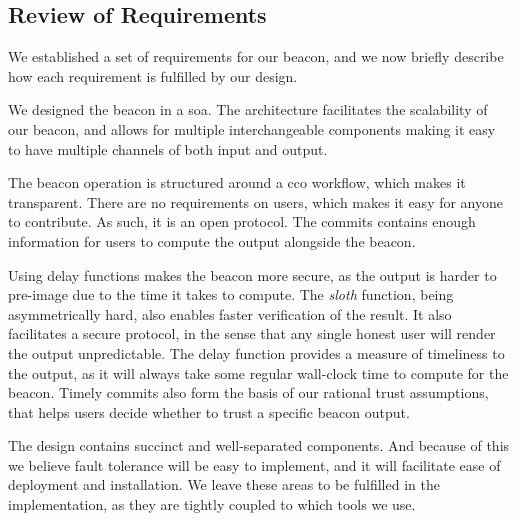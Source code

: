 \subsection{Review of Requirements}
We established a set of requirements for our beacon, and we now briefly describe how each requirement is fulfilled by our design.







We designed the beacon in a \gls{soa}.
The architecture facilitates the scalability of our beacon, and allows for multiple interchangeable components making it easy to have multiple channels of both input and output.

The beacon operation is structured around a \acrshort{cco} workflow, which makes it transparent.
There are no requirements on users, which makes it easy for anyone to contribute.
As such, it is an open protocol.
The commits contains enough information for users to compute the output alongside the beacon.

Using delay functions makes the beacon more secure, as the output is harder to pre-image due to the time it takes to compute.
The \emph{sloth} function, being asymmetrically hard, also enables faster verification of the result.
It also facilitates a secure protocol, in the sense that any single honest user will render the output unpredictable.
The delay function provides a measure of timeliness to the output, as it will always take some regular wall-clock time to compute for the beacon.
Timely commits also form the basis of our rational trust assumptions, that helps users decide whether to trust a specific beacon output.

The design contains succinct and well-separated components.
And because of this we believe fault tolerance will be easy to implement, and it will facilitate ease of deployment and installation.
We leave these areas to be fulfilled in the implementation, as they are tightly coupled to which tools we use.

